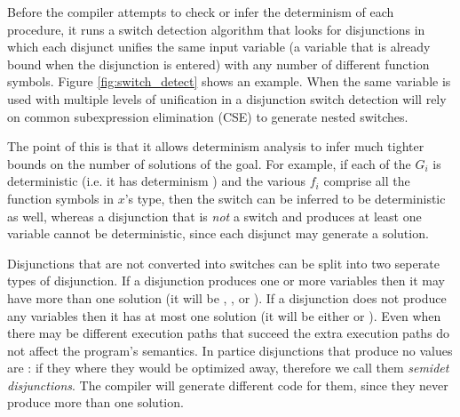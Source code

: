 Before the compiler attempts to check or infer
the determinism of each procedure,
it runs a switch detection algorithm that looks for disjunctions
in which each disjunct unifies the same input variable
(a variable that is already bound when the disjunction is entered)
with any number of different function symbols.
Figure \ref{fig:switch_detect} shows an example.
When the same variable is used with multiple levels of unification in a
disjunction switch detection will rely on
common subexpression elimination (CSE)
to generate nested switches.

The point of this is that it allows determinism analysis
to infer much tighter bounds on the number of solutions of the goal.
For example, if each of the $G_i$ is deterministic
(i.e. it has determinism )
and the various $f_i$ comprise all the function symbols in $x$'s type,
then the switch can be inferred to be deterministic as well,
whereas a disjunction that is \emph{not} a switch and produces at least one
variable
cannot be deterministic,
since each disjunct may generate a solution.

Disjunctions that are not converted into switches can be split into two
seperate types of disjunction.
If a disjunction produces one or more variables
then it may have more than one solution
(it will be \dnondet, \dmulti, \dccnondet or \dccmulti).
If a disjunction does not produce any variables
then it has at most one solution
(it will be either \dsemidet or \ddet).
Even when there may be different execution paths that succeed
the extra execution paths do not affect the program's semantics.
In partice disjunctions that produce no values are \dsemidet:
if they where \ddet they would be optimized away,
therefore we call them \emph{semidet disjunctions}.
The compiler will generate different code for them,
since they never produce more than one solution.

